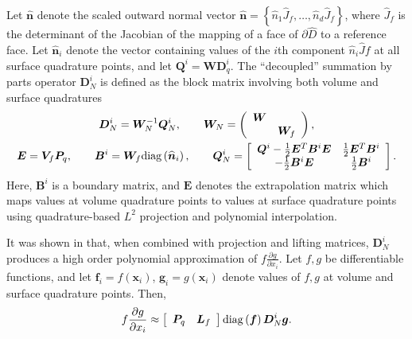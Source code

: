 \documentclass[review]{siamart0216}
\theoremstyle{assumption}
\renewcommand{\hat}[1]{\hat{#1}}
\newcommand{\pd}[2]{\frac{\partial#1}{\partial#2}}
\newcommand{\LRp}[1]{\left( #1 \right)}
\newcommand{\LRs}[1]{\left[ #1 \right]}
\newcommand{\LRc}[1]{\left\{ #1 \right\}}
\renewcommand{\hat}{\widehat}
\newcommand{\diag}[1]{{\rm diag}\LRp{#1}}
\begin{document}
Let $\hat{\bm{n}}$ denote the scaled outward normal vector $\hat{\bm{n}} = \LRc{\hat{n}_1\hat{J}_f,\ldots,\hat{n}_d\hat{J}_f}$, where $\hat{J}_f$ is the determinant of the Jacobian of the mapping of a face of $\partial \hat{D}$ to a reference face.  Let $\hat{\bm{n}}_i$ denote the vector containing values of the $i$th component $\hat{n}_i\hat{J}f$ at all surface quadrature points, and let $\bm{Q}^i = \bm{W}\bm{D}^i_q$.  The ``decoupled'' summation by parts operator $\bm{D}^i_N$ is defined as the block matrix involving both volume and surface quadratures
\begin{gather}
\bm{D}^i_N = \bm{W}_N^{-1} \bm{Q}^i_N, \qquad \bm{W}_N = \LRp{\begin{array}{cc}\bm{W}&\\ & \bm{W}_f\end{array}}, \label{eq:QN}\\
\bm{E} = \bm{V}_f\bm{P}_q, \qquad \bm{B}^i = \bm{W}_f \diag{\hat{\bm{n}}_i}, \qquad \bm{Q}^i_N  = \LRs{
\begin{array}{cc}
\bm{Q}^i - \frac{1}{2}\bm{E}^T\bm{B}^i\bm{E} &  \frac{1}{2}\bm{E}^T\bm{B}^i\\
-\frac{1}{2}\bm{B}^i\bm{E} & \frac{1}{2} \bm{B}^i
\end{array}}.  \nonumber
\end{gather}
Here, $\bm{B}^i$ is a boundary matrix, and $\bm{E}$ denotes the extrapolation matrix which maps values at volume quadrature points to values at surface quadrature points using quadrature-based $L^2$ projection and polynomial interpolation.  

It was shown in \cite{chan2017discretely, chan2018efficient} that, when combined with projection and lifting matrices, $\bm{D}^i_N$ produces a high order polynomial approximation of $f\pd{g}{x_i}$. 
Let $f, g$ be differentiable functions, and let $\bm{f}_i = f(\bm{x}_i)$, $\bm{g}_i = g(\bm{x}_i)$ denote values of $f,g$ at volume and surface quadrature points.  Then,
\begin{gather}
f\pd{g}{x_i} \approx \LRs{\begin{array}{cc}
\bm{P}_q & \bm{L}_f\end{array}} {\rm diag}\LRp{\bm{f}}\bm{D}^i_N \bm{g}.  
\label{eq:dnapprox}
\end{gather}
\end{document}
